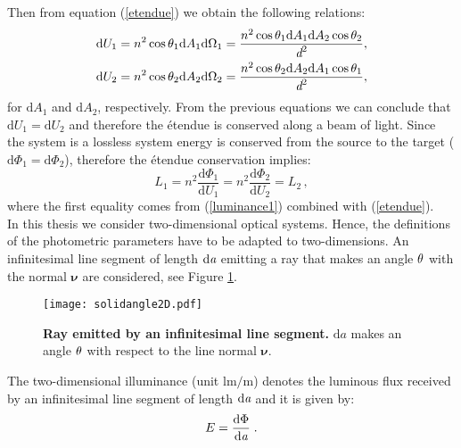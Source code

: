 Then from equation (\ref{etendue}) we obtain the following relations: 
\begin{subequations}
\begin{align}
\textrm{d}U_1 &= n^2\cos\theta_1 \textrm{d}A_1\textrm{d}\Omega_1= \frac{n^2\cos\theta_1 \textrm{d}A_1\textrm{d}A_2\cos\theta_2}{\textit{d}^2},\\
\textrm{d}U_2 &= n^2 \cos\theta_2\textrm{d}A_2\textrm{d}\Omega_2= \frac{ n^2 \cos\theta_2\textrm{d}A_2\textrm{d}A_1\cos\theta_1}{\textit{d}^2}, \label{eq:dU2}
\end{align}
\end{subequations}
for $\textrm{d}A_1$ and $\textrm{d}A_2$, respectively.
From the previous equations we can conclude that $\textrm{d}U_1=\textrm{d}U_2$ and therefore the \'{e}tendue is conserved along a beam of light. 
Since the system is a lossless system energy is conserved from the source to the target ($\textrm{d}\Phi_1= \textrm{d}\Phi_2$), therefore the \'{e}tendue conservation implies:
\begin{equation}\label{basicluminance}
L_1 = n^2 \frac{\textrm{d}\Phi_1}{\textrm{d}U_1} = n^2 \frac{\textrm{d}\Phi_2}{\textrm{d}U_2} = L_2\,,
\end{equation}
where the first equality comes from (\ref{luminance1}) combined with (\ref{etendue}).
\\ \indent In this thesis we consider two-dimensional optical systems. 
 Hence, the definitions of the photometric parameters have to be adapted to two-dimensions. An infinitesimal line segment of length $\textrm{d}\textit{a}$ emitting a ray that makes an angle $\theta$ with the normal $\boldsymbol{\nu}$ are considered, see Figure \ref{fig:2Dsolidangle}. 
\begin{figure}[t]
 \label{fig:2Dsolidangle}
     \begin{center}
     \texttt{[image: solidangle2D.pdf]}
     \end{center}
     \caption{\textbf{Ray emitted by an infinitesimal line segment.} $\textrm{d}a$ makes an angle $\theta$ with respect to the line normal $\boldsymbol{\nu}$.}
\label{fig:2Dsolidangle}
 \end{figure}
The two-dimensional illuminance (unit $\textrm{lm}/\textrm{m}$) denotes the luminous flux received by an infinitesimal line segment of length $\textrm{d}\textit{a}$ 
and it is given by:
 \begin{equation}
 E=\frac{\textrm{d}\Phi}{\textrm{d}\textit{a}}\;.
 \end{equation}
